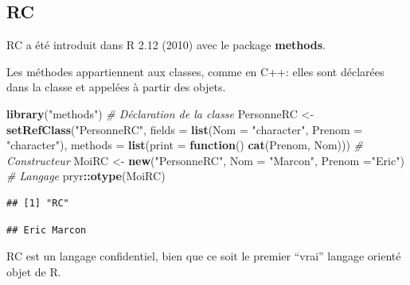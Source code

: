 \documentclass[
  12pt,
  french,
  a4paper,
  extrafontsizes,onecolumn,openright
  ]{memoir}
\newenvironment{Shaded}{\begin{snugshade}}{\end{snugshade}}
\newcommand{\CommentTok}[1]{\textcolor[rgb]{0.56,0.35,0.01}{\textit{#1}}}
\newcommand{\ControlFlowTok}[1]{\textcolor[rgb]{0.13,0.29,0.53}{\textbf{#1}}}
\newcommand{\DataTypeTok}[1]{\textcolor[rgb]{0.13,0.29,0.53}{#1}}
\newcommand{\KeywordTok}[1]{\textcolor[rgb]{0.13,0.29,0.53}{\textbf{#1}}}
\newcommand{\NormalTok}[1]{#1}
\newcommand{\OperatorTok}[1]{\textcolor[rgb]{0.81,0.36,0.00}{\textbf{#1}}}
\newcommand{\StringTok}[1]{\textcolor[rgb]{0.31,0.60,0.02}{#1}}
\begin{document}
\hypertarget{rc}{%
\subsection{RC}\label{rc}}

RC a été introduit dans R 2.12 (2010) avec le package \textbf{methods}.

Les méthodes appartiennent aux classes, comme en C++: elles sont déclarées dans la classe et appelées à partir des objets.

\scriptsize

\begin{Shaded}
\begin{Highlighting}[]
\KeywordTok{library}\NormalTok{(}\StringTok{"methods"}\NormalTok{)}
\CommentTok{# Déclaration de la classe}
\NormalTok{PersonneRC <-}\StringTok{ }\KeywordTok{setRefClass}\NormalTok{(}\StringTok{"PersonneRC"}\NormalTok{, }
    \DataTypeTok{fields =} \KeywordTok{list}\NormalTok{(}\DataTypeTok{Nom =} \StringTok{"character"}\NormalTok{, }\DataTypeTok{Prenom =} \StringTok{"character"}\NormalTok{),}
    \DataTypeTok{methods =} \KeywordTok{list}\NormalTok{(}\DataTypeTok{print =} \ControlFlowTok{function}\NormalTok{() }\KeywordTok{cat}\NormalTok{(Prenom, Nom)))}
\CommentTok{# Constructeur}
\NormalTok{MoiRC <-}\StringTok{ }\KeywordTok{new}\NormalTok{(}\StringTok{"PersonneRC"}\NormalTok{, }\DataTypeTok{Nom =} \StringTok{"Marcon"}\NormalTok{, }\DataTypeTok{Prenom =}\StringTok{"Eric"}\NormalTok{)}
\CommentTok{# Langage}
\NormalTok{pryr}\OperatorTok{::}\KeywordTok{otype}\NormalTok{(MoiRC)}
\end{Highlighting}
\end{Shaded}

\begin{verbatim}
## [1] "RC"
\end{verbatim}

\begin{Shaded}
\end{Shaded}

\begin{verbatim}
## Eric Marcon
\end{verbatim}

\normalsize

RC est un langage confidentiel, bien que ce soit le premier \enquote{vrai} langage orienté objet de R.
\end{document}
